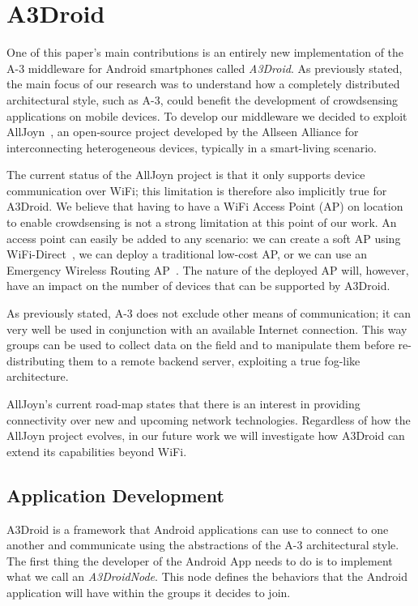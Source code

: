 \section{A3Droid}
\label{sec:a3droid}

One of this paper's main contributions is an entirely new implementation of the A-3 middleware for Android smartphones called \emph{A3Droid}. As previously stated, the main focus of our research was to understand how a completely distributed architectural style, such as A-3, could benefit the development of crowdsensing applications on mobile devices. To develop our middleware we decided to exploit AllJoyn~\cite{alljoyn}, an open-source project developed by the Allseen Alliance for interconnecting heterogeneous devices, typically in a smart-living scenario. 

The current status of the AllJoyn project is that it only supports device communication over WiFi; this limitation is therefore also implicitly true for A3Droid. We believe that having to have a WiFi Access Point (AP) on location to enable crowdsensing is not a strong limitation at this point of our work. An access point can easily be added to any scenario: we can create a soft AP using WiFi-Direct~\cite{wifidirect}, we can deploy a traditional low-cost AP, or we can use an Emergency Wireless Routing AP~\cite{EWRAP}. The nature of the deployed AP will, however, have an impact on the number of devices that can be supported by A3Droid. 

As previously stated, A-3 does not exclude other means of communication; it can very well be used in conjunction with an available Internet connection. This way groups can be used to collect data on the field and to manipulate them before re-distributing them to a remote backend server, exploiting a true fog-like architecture.

AllJoyn's current road-map states that there is an interest in providing connectivity over new and upcoming network technologies. Regardless of how the AllJoyn project evolves, in our future work we will investigate how A3Droid can extend its capabilities beyond WiFi. 

\subsection{Application Development}
\label{subg:a3droidNodes}

A3Droid is a framework that Android applications can use to connect to one another and communicate using the abstractions of the A-3 architectural style. The first thing the developer of the Android App needs to do is to implement what we call an \emph{A3DroidNode}. This node defines the behaviors that the Android application will have within the groups it decides to join.

